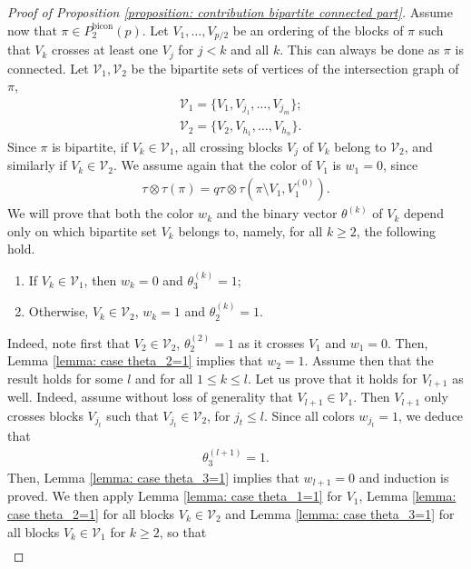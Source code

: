 \documentclass[12pt,reqno]{amsart}
\theoremstyle{plain}
\newcommand{\1}{\mathbf{1}}
\begin{document}
\begin{proof}[Proof of Proposition \ref{proposition: contribution bipartite connected part}]
    Assume now that $\pi \in P_2^{\operatorname{bicon}}(p)$. Let $V_1,\ldots,V_{p/2}$ be an ordering of the blocks of $\pi$ such that $V_k$ crosses at least one $V_j$ for $j<k$ and all $k$. This can always be done as $\pi$ is connected. Let $\mathcal{V}_1,\mathcal{V}_2$ be the bipartite sets of vertices of the intersection graph of $\pi$,
    \begin{align*}
        &\mathcal{V}_1=\{V_1,V_{j_1},\ldots,V_{j_m}\};\\
        &\mathcal{V}_2=\{V_2,V_{h_1},\ldots,V_{h_n}\}.
    \end{align*}
    Since $\pi$ is bipartite, if $V_k \in \mathcal{V}_1$, all crossing blocks $V_j$ of $V_k$ belong to $\mathcal{V}_2$, and similarly if $V_k \in \mathcal{V}_2$. We assume again that the color of $V_1$ is $w_1=0$, since
    \begin{align*}
        \tau\otimes \tau(\pi)=q \tau\otimes\tau \left(\pi\setminus V_1,V_1^{(0)}\right).
    \end{align*}
    We will prove that both the color $w_k$ and the binary vector $\theta^{(k)}$ of $V_k$ depend only on which bipartite set $V_k$ belongs to, namely, for all $k \ge 2$, the following hold.
    \begin{enumerate}
        \item If $V_k \in \mathcal{V}_1$, then $w_k=0$ and $\theta^{(k)}_{3}=1$;
        \item Otherwise, $V_k \in \mathcal{V}_2$, $w_k=1$ and $\theta^{(k)}_2=1$.
    \end{enumerate}
    Indeed, note first that $V_2 \in \mathcal{V}_2$, $\theta^{(2)}_2=1$ as it crosses $V_1$ and $w_1=0$. Then, Lemma \ref{lemma: case theta_2=1} implies that $w_2=1$. Assume then that the result holds for some $l$ and for all $1 \le k \le l$. Let us prove that it holds for $V_{l+1}$ as well. Indeed, assume without loss of generality that $V_{l+1} \in \mathcal{V}_1$. Then $V_{l+1}$ only crosses blocks $V_{j_t}$ such that $V_{j_t} \in \mathcal{V}_2$, for $j_t \le l$. Since all colors $w_{j_t}=1$, we deduce that
    \begin{align*}
        \theta^{(l+1)}_3=1.
    \end{align*}
    Then, Lemma \ref{lemma: case theta_3=1} implies that $w_{l+1}=0$ and induction is proved. We then apply Lemma \ref{lemma: case theta_1=1} for $V_1$, Lemma \ref{lemma: case theta_2=1} for all blocks $V_k \in \mathcal{V}_2$ and Lemma \ref{lemma: case theta_3=1} for all blocks $V_k \in \mathcal{V}_1$ for $k \ge 2$, so that
    \begin{align*}

\end{align*}
\end{proof}
\end{document}
